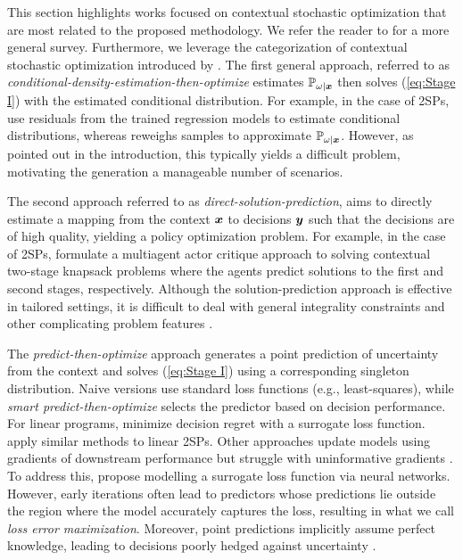 
This section highlights works focused on contextual stochastic optimization that are most related to the proposed methodology. We refer the reader to \citet{sadana2024survey} for a more general survey.  Furthermore, we leverage the categorization of contextual stochastic optimization introduced by \citet{estes2023smart}. The first general approach, referred to as \textit{conditional-density-estimation-then-optimize} estimates $\mathbb{P}_{\omega|\boldsymbol{x}}$ then solves (\ref{eq:Stage I}) with the estimated conditional distribution. For example, in the case of 2SPs, \citet{ban2019dynamic} use residuals from the trained regression models to estimate conditional distributions, whereas \citet{bertsimas2020predictive} reweighs samples to approximate $\mathbb{P}_{\omega|\boldsymbol{x}}$. However, as pointed out in the introduction, this typically yields a difficult problem, motivating the generation a manageable number of scenarios. 

The second approach referred to as \textit{direct-solution-prediction}, aims to directly estimate a mapping from the context $\boldsymbol{x}$ to decisions $\boldsymbol{y}$ such that the decisions are of high quality, yielding a policy optimization problem. For example, in the case of 2SPs, \citet{yilmaz2023deep} formulate a multiagent actor critique approach to solving contextual two-stage knapsack problems where the agents predict solutions to the first and second stages, respectively. Although the solution-prediction approach is effective in tailored settings, it is difficult to deal with general integrality constraints and other complicating problem features \citep{patel2022neur2sp,zharmagambetov2023landscape}. 

The \textit{predict-then-optimize} approach generates a point prediction of uncertainty from the context and solves (\ref{eq:Stage I}) using a corresponding singleton distribution. Naive versions use standard loss functions (e.g., least-squares), while \textit{smart predict-then-optimize} selects the predictor based on decision performance. For linear programs, \citet{elmachtoub2021smart} minimize decision regret with a surrogate loss function. \citet{estes2023smart} apply similar methods to linear 2SPs. Other approaches update models using gradients of downstream performance \citep{agrawal2019differentiable} but struggle with uninformative gradients \citep{grigas2021integrated, zharmagambetov2023landscape}. To address this, \citet{zharmagambetov2023landscape} propose modelling a surrogate loss function via neural networks. However, early iterations often lead to predictors whose predictions lie outside the region where the model accurately captures the loss, resulting in what we call \textit{loss error maximization}. Moreover, point predictions implicitly assume perfect knowledge, leading to decisions poorly hedged against uncertainty \citep{king2012modeling}.

